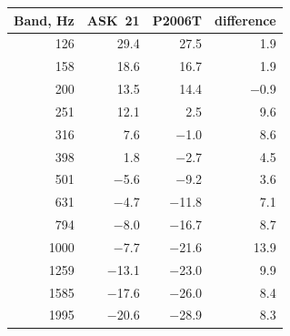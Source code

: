 \begin{tabular}{@{}rrrr@{}}
\toprule
Band, Hz & ASK~21 & P2006T & difference \\
\midrule
126 & 29.4 & 27.5 & 1.9 \\
158 & 18.6 & 16.7 & 1.9 \\
200 & 13.5 & 14.4 & $-$0.9 \\
251 & 12.1 & 2.5 & 9.6 \\
316 & 7.6 & $-$1.0 & 8.6 \\
398 & 1.8 & $-$2.7 & 4.5 \\
501 & $-$5.6 & $-$9.2 & 3.6 \\
631 & $-$4.7 & $-$11.8 & 7.1 \\
794 & $-$8.0 & $-$16.7 & 8.7 \\
1000 & $-$7.7 & $-$21.6 & 13.9 \\
1259 & $-$13.1 & $-$23.0 & 9.9 \\
1585 & $-$17.6 & $-$26.0 & 8.4 \\
1995 & $-$20.6 & $-$28.9 & 8.3 \\
\bottomrule
\end{tabular}
